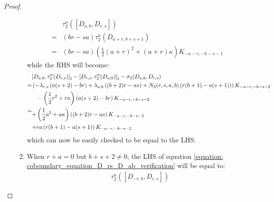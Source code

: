 \begin{proof}
\begin{enumerate}
\begin{enumerate}
$$\begin{aligned}
                                    & \tau_2^{\kappa}([D_{a, b}, D_{r, s}])
                                    \\
                                    = & (br - sa) \tau_2^{\kappa}(D_{a + r, b + s + 1})
                                    \\
                                    = & (br - sa) \left( \frac12 (a + r)^2 + (a + r)\kappa \right) K_{-a - r, -b - s - 1}
                                \end{aligned}
                            $$
                        while the RHS will become:
                            $$
                                \begin{aligned}
                                    & [D_{a, b}, \tau_2^{\kappa}(D_{r, s})]_{\extendedtoroidal} - [D_{r, s}, \tau_2^{\kappa}(D_{a, b})]_{\extendedtoroidal} - \sigma_2(D_{a, b}, D_{r, s})
                                    \\
                                    = & \left( -\lambda_{r, s} \left( a(s + 2) - br \right) + \lambda_{a, b} \left( (b + 2) r - as \right) + N_2(r, s, a, b)\left( r(b + 1) - a(s + 1) \right) \right) K_{-a - r, -b - s - 2}
                                    \\
                                    = &
                                    \begin{aligned}
                                        & -\left( \frac12 r^2 + r\kappa \right) \left( a(s + 2) - br \right) K_{-a - r, -b - s - 2}
                                        \\
                                        + & \left( \frac12 a^2 + a\kappa \right) \left( (b + 2) r - as \right) K_{-a - r, -b - s - 2} 
                                        \\
                                        + & ra\left( r(b + 1) - a(s + 1) \right) K_{-a - r, -b - s - 2}
                                    \end{aligned}
                                \end{aligned}
                            $$
                        which can now be easily checked to be equal to the LHS.
                        \item When $r + a = 0$ but $b + s + 2 \not = 0$, the LHS of equation \eqref{equation: coboundary_equation_D_rs_D_ab_verification} will be equal to:
                            $$
                                \begin{aligned}
                                    & \tau_2^{\kappa}([D_{-r, b}, D_{r, s}])

\end{aligned}$$
\end{enumerate}
\end{enumerate}
\end{proof}

